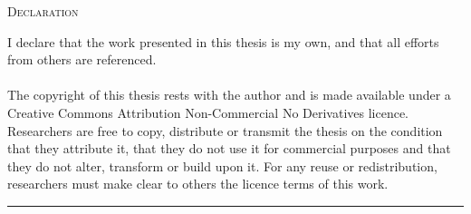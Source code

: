\vspace*{140px}
\begin{center}
\textsc{\LARGE Declaration}
\end{center}
I declare that the work presented in this thesis is my own, and that all efforts from others are referenced. \\ \\
The copyright of this thesis rests with the author and is made available under a Creative Commons Attribution Non-Commercial No Derivatives licence. Researchers are free to copy, distribute or transmit the thesis on the condition that they attribute it, that they do not use it for commercial purposes and that they do not alter, transform or build upon it. For any reuse or redistribution, researchers must make clear to others the licence terms of this work. \\ 
\begin{center}
\rule{125px}{0.2px}
\end{center}
\vfill
\pagebreak